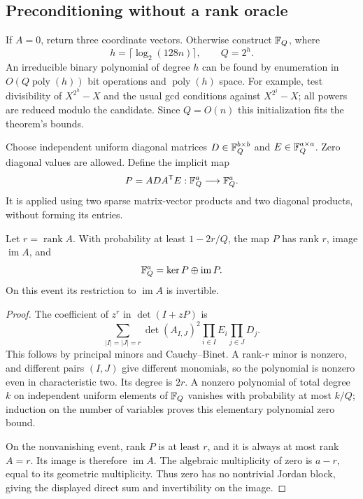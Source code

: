\subsection{Preconditioning without a rank oracle}

If $A=0$, return three coordinate vectors.  Otherwise construct
$\mathbb F_Q$, where
\[
 h=\lceil\log_2(128n)\rceil,\qquad Q=2^h.
\]
An irreducible binary polynomial of degree $h$ can be found by
enumeration in $O(Q\operatorname{poly}(h))$ bit operations and
$\operatorname{poly}(h)$ space.  For example, test divisibility
of $X^{2^h}-X$ and the usual gcd conditions against
$X^{2^j}-X$; all powers are reduced modulo the candidate.
Since $Q=O(n)$ this initialization fits the theorem's bounds.

Choose independent uniform diagonal matrices
$D\in\mathbb F_Q^{b\times b}$ and $E\in\mathbb F_Q^{a\times a}$.
Zero diagonal values are allowed.  Define the implicit map
\begin{equation}
 P=ADA^{\mathsf T}E:\mathbb F_Q^a\longrightarrow\mathbb F_Q^a.
 \label{rf:preconditioner}
\end{equation}
It is applied using two sparse matrix-vector products and two
diagonal products, without forming its entries.

\begin{lemma}
\label{rf:precondlemma}
Let $r=\operatorname{rank}A$.  With probability at least
$1-2r/Q$, the map $P$ has rank $r$, image $\operatorname{im}A$,
and
\[
 \mathbb F_Q^a=\ker P\oplus\operatorname{im}P.
\]
On this event its restriction to $\operatorname{im}A$ is invertible.
\end{lemma}
\begin{proof}
The coefficient of $z^r$ in $\det(I+zP)$ is
\[
 \sum_{|I|=|J|=r}
      \det(A_{I,J})^2\prod_{i\in I}E_i\prod_{j\in J}D_j.
\]
This follows by principal minors and Cauchy--Binet.  A rank-$r$
minor is nonzero, and different pairs $(I,J)$ give different
monomials, so the polynomial is nonzero even in characteristic
two.  Its degree is $2r$.  A nonzero polynomial of total degree
$k$ on independent uniform elements of $\mathbb F_Q$ vanishes with
probability at most $k/Q$; induction on the number of variables
proves this elementary polynomial zero bound.

On the nonvanishing event, rank $P$ is at least $r$, and it is
always at most rank $A=r$.  Its image is therefore
$\operatorname{im}A$.  The algebraic multiplicity of zero is
$a-r$, equal to its geometric multiplicity.  Thus zero has no
nontrivial Jordan block, giving the displayed direct sum and
invertibility on the image.
\end{proof}

